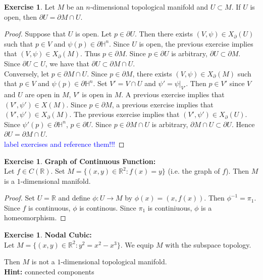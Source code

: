 \documentclass{book}
\theoremstyle{definition}
\newtheorem{ex}[definition]{Exercise}
\renewcommand{\H}{\mathbb{H}}
\newcommand{\R}{\mathbb{R}}
\DeclareMathOperator*{\0}{\mbf{0}}
\DeclareMathOperator*{\1}{\mbf{1}}
\newcommand{\tbf}[1]{\textbf{#1}}
\newcommand{\tcb}[1]{\textcolor{blue}{#1}}
\newcommand{\p}{\partial}
\begin{document}
	\begin{ex}
		Let $M$ be an $n$-dimensional topological manifold and $U \subset M$. If $U$ is open, then $\p U = \p M \cap U$.
	\end{ex}

	\begin{proof}
		Suppose that $U$ is open. Let $p \in \p U$. Then there exists $(V, \psi) \in X_{\p}(U)$ such that $p \in V$ and $\psi(p) \in \p \H^n$. Since $U$ is open, the previous exercise implies that $(V, \psi) \in X_{\p}(M)$. Thus $p \in \p M$. Since $p \in \p U$ is arbitrary, $\p U \subset \p M$. Since $\p U \subset U$, we have that $\p U \subset \p M \cap U$.\\
		Conversely, let $p \in \p M \cap U$. Since $p \in \p M$, there exists $(V, \psi) \in X_{\p}(M)$ such that $p \in V$ and $\psi(p) \in \p \H^n$. Set $V' = V \cap U$ and $\psi' = \psi|_{V'}$. Then $p \in V'$ since $V$ and $U$ are open in $M$, $V'$ is open in $M$. A previous exercise implies that $(V', \psi') \in X(M)$. Since $p \in \p M$, a previous exercise implies that $(V', \psi') \in X_{\p}(M)$. The previous exercise implies that $(V', \psi') \in X_{\p}(U)$. Since $\psi'(p) \in \p \H^n$, $p \in \p U$. Since $p \in \p M \cap U$ is arbitrary, $\p M \cap U \subset \p U$. Hence  $\p U = \p M \cap U$. \\
		\tcb{label exercises and reference them!!!}
	\end{proof}

	\begin{ex} \tbf{Graph of Continuous Function:} \\
		Let $f \in C(\R)$. Set $M = \{(x,y) \in \R^2: f(x) = y\}$ (i.e. the graph of $f$). Then $M$ is a $1$-dimensional manifold.  
	\end{ex}
	
	\begin{proof}
		Set $U = \R$ and define $\phi: U \rightarrow M$ by $\phi(x) = (x, f(x))$. Then $\phi^{-1} = \pi_1$. Since $f$ is continuous, $\phi$ is continous. Since $\pi_1$ is continiuous, $\phi$ is a homeomorphism.  
	\end{proof}
	
	\begin{ex} \tbf{Nodal Cubic:}\\
		Let $M = \{(x,y) \in \R^2: y^2 = x^2 - x^3\}$. We equip $M$ with the subspace topology.
		\begin{center}
		\end{center}
		Then $M$ is not a $1$-dimensional topological manifold.\\
		\tbf{Hint:} connected components
	\end{ex}
\end{document}
